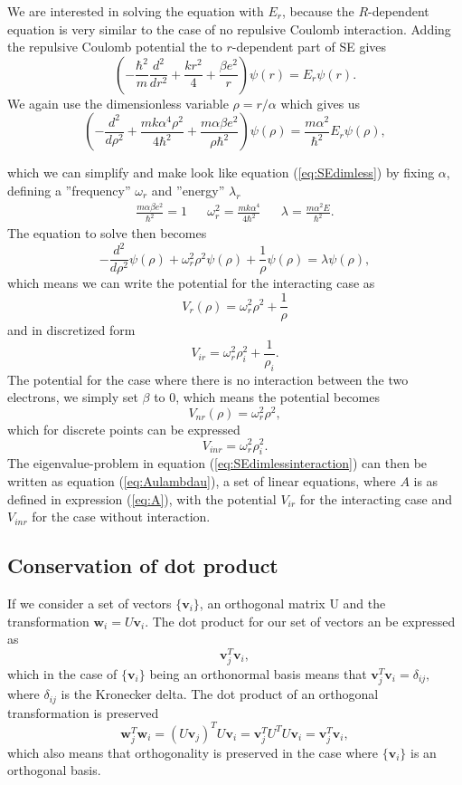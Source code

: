 \documentclass[norsk,a4paper,12pt]{article}
\begin{document}
We are interested in solving the equation with $E_r$, because the $R$-dependent equation is very similar to the case of no repulsive Coulomb interaction. Adding the repulsive Coulomb potential the to $r$-dependent part of SE gives
$$\left(-\frac{\hbar ^2}{m}\frac{d^2}{dr^2} + \frac{kr^2}{4} + \frac{\beta e^2}{r}\right)\psi(r) = E_r\psi(r).$$ 
We again use the dimensionless variable $\rho = r/\alpha$ which gives us 
\begin{equation}
\left(-\frac{d^2}{d\rho ^2} + \frac{mk\alpha ^4 \rho ^2}{4\hbar ^2} + \frac{m\alpha \beta e^2}{\rho \hbar^2}\right)\psi(\rho) = \frac{m\alpha ^2}{\hbar^2}E_r\psi(\rho),
\label{eq:SEdimlessvars}
\end{equation}

which we can simplify and make look like equation (\ref{eq:SEdimless}) by fixing $\alpha$, defining a ''frequency'' $\omega _r$ and ''energy'' $\lambda_r$
\begin{align*}
\frac{m\alpha\beta e^2}{\hbar^2} = 1 && \omega_r^2 = \frac{mk\alpha^4}{4\hbar^2} && \lambda = \frac{m\alpha^2E}{\hbar^2}.
\end{align*}
The equation to solve then becomes \begin{equation}
-\frac{d^2}{d\rho ^2}\psi (\rho) + \omega_r^2\rho^2\psi(\rho) + \frac{1}{\rho}\psi(\rho) = \lambda \psi (\rho),
\label{eq:SEdimlessinteraction}
\end{equation}
which means we can write the potential for the interacting case as $$V_r(\rho) = \omega_r^2\rho^2 + \frac{1}{\rho}$$
and in discretized form $$V_{ir} = \omega_r^2\rho_i^2 + \frac{1}{\rho_i}.$$ The potential for the case where there is no interaction between the two electrons, we simply set $\beta$ to $0$, which means the potential becomes $$V_{nr}(\rho) = \omega_r^2 \rho^2,$$ which for discrete points can be expressed
$$V_{inr} = \omega_r^2\rho_i^2.$$
The eigenvalue-problem in equation (\ref{eq:SEdimlessinteraction}) can then be written as equation (\ref{eq:Aulambdau}), a set of linear equations, where $A$ is as defined in expression (\ref{eq:A}), with the potential $V_{ir}$ for the interacting case and $V_{inr}$ for the case without interaction.
\subsection{Conservation of dot product}
If we consider a set of vectors $\{\textbf{v}_i\}$, an orthogonal matrix U and the transformation $\textbf{w}_i = U\textbf{v}_i$. The dot product for our set of vectors an be expressed as $$\textbf{v}_j^T\textbf{v}_i,$$ which in the case of $\{\textbf{v}_i\}$ being an orthonormal basis means that $\textbf{v}_j^T\textbf{v}_i = \delta_{ij},$ where $\delta_{ij}$ is the Kronecker delta. The dot product of an orthogonal transformation is preserved
$$\textbf{w}_j^T \textbf{w}_i = (U\textbf{v}_j)^TU\textbf{v}_i = \textbf{v}_j^TU^TU\textbf{v}_i = \textbf{v}_j^T\textbf{v}_i,$$ which also means that orthogonality is preserved in the case where $\{\textbf{v}_i\}$ is an orthogonal basis.
\end{document}
